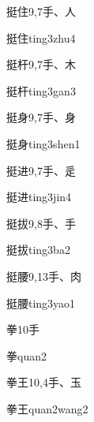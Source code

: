 \begin{Entry}{挺住}{9,7}{⼿、⼈}
  \begin{Phonetics}{挺住}{ting3zhu4}
  \end{Phonetics}
\end{Entry}

\begin{Entry}{挺杆}{9,7}{⼿、⽊}
  \begin{Phonetics}{挺杆}{ting3gan3}
  \end{Phonetics}
\end{Entry}

\begin{Entry}{挺身}{9,7}{⼿、⾝}
  \begin{Phonetics}{挺身}{ting3shen1}
  \end{Phonetics}
\end{Entry}

\begin{Entry}{挺进}{9,7}{⼿、⾡}
  \begin{Phonetics}{挺进}{ting3jin4}
  \end{Phonetics}
\end{Entry}

\begin{Entry}{挺拔}{9,8}{⼿、⼿}
  \begin{Phonetics}{挺拔}{ting3ba2}
  \end{Phonetics}
\end{Entry}

\begin{Entry}{挺腰}{9,13}{⼿、⾁}
  \begin{Phonetics}{挺腰}{ting3yao1}
  \end{Phonetics}
\end{Entry}

\begin{Entry}{拳}{10}{⼿}
  \begin{Phonetics}{拳}{quan2}
  \end{Phonetics}
\end{Entry}

\begin{Entry}{拳王}{10,4}{⼿、⽟}
  \begin{Phonetics}{拳王}{quan2wang2}
  \end{Phonetics}
\end{Entry}

